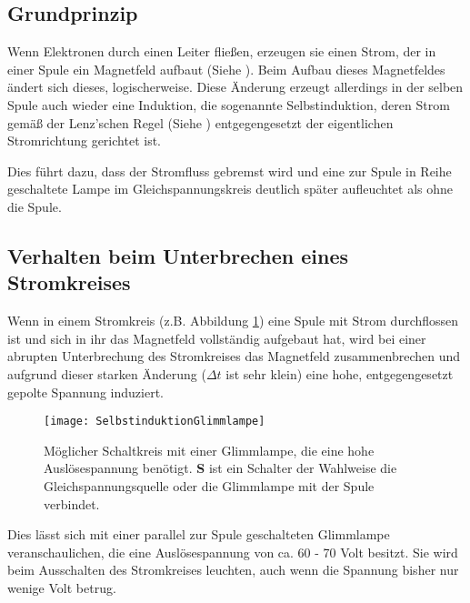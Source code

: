 \subsection{Grundprinzip}

Wenn Elektronen durch einen Leiter fließen, erzeugen sie einen Strom, der in einer Spule ein Magnetfeld aufbaut (Siehe ). Beim Aufbau dieses Magnetfeldes ändert sich dieses, logischerweise. Diese Änderung erzeugt allerdings in der selben Spule auch wieder eine Induktion, die sogenannte Selbstinduktion, deren Strom gemäß der Lenz'schen Regel (Siehe ) entgegengesetzt der eigentlichen Stromrichtung gerichtet ist.

Dies führt dazu, dass der Stromfluss \glqq gebremst\grqq{} wird und eine zur Spule in Reihe geschaltete Lampe im Gleichspannungskreis deutlich später aufleuchtet als ohne die Spule.

\subsection{Verhalten beim Unterbrechen eines Stromkreises}

Wenn in einem Stromkreis (z.B. Abbildung \ref{fig:SchaltkreisGlimmlampe}) eine Spule mit Strom durchflossen ist und sich in ihr das Magnetfeld vollständig aufgebaut hat, wird bei einer abrupten Unterbrechung des Stromkreises das Magnetfeld zusammenbrechen und aufgrund dieser starken Änderung ($\Delta t$ ist sehr klein) eine hohe, entgegengesetzt gepolte Spannung induziert.

\begin{figure}
	\centering
	\texttt{[image: SelbstinduktionGlimmlampe]}
	\caption{Möglicher Schaltkreis mit einer Glimmlampe, die eine hohe Auslösespannung benötigt. \textbf{S} ist ein Schalter der Wahlweise die Gleichspannungsquelle oder die Glimmlampe mit der Spule verbindet.}
	\label{fig:SchaltkreisGlimmlampe}
\end{figure}

Dies lässt sich mit einer parallel zur Spule geschalteten Glimmlampe veranschaulichen, die eine Auslösespannung von ca. 60 - 70 Volt besitzt. Sie wird beim Ausschalten des Stromkreises leuchten, auch wenn die Spannung bisher nur wenige Volt betrug.